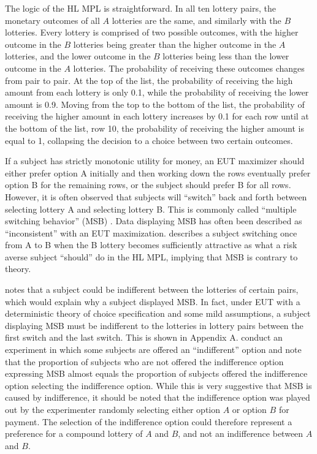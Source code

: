 \documentclass[../main.tex]{subfiles}
\begin{document}
The logic of the HL MPL is straightforward.
In all ten lottery pairs, the monetary outcomes of all $A$ lotteries are the same, and similarly with the $B$ lotteries.
Every lottery is comprised of two possible outcomes, with the higher outcome in the $B$ lotteries being greater than the higher outcome in the $A$ lotteries, and the lower outcome in the $B$ lotteries being less than the lower outcome in the $A$ lotteries.
The probability of receiving these outcomes changes from pair to pair.
At the top of the list, the probability of receiving the high amount from each lottery is only 0.1, while the probability of receiving the lower amount is 0.9.
Moving from the top to the bottom of the list, the probability of receiving the higher amount in each lottery increases by 0.1 for each row until at the bottom of the list, row 10, the probability of receiving the higher amount is equal to 1, collapsing the decision to a choice between two certain outcomes.


If a subject has strictly monotonic utility for money, an EUT maximizer should either prefer option A initially and then working down the rows eventually prefer option B for the remaining rows, or the subject should prefer B for all rows.
However, it is often observed that subjects will \enquote{switch} back and forth between selecting lottery A and selecting lottery B.
This is commonly called \enquote{multiple switching behavior} (MSB) \parencite{Bruner2011}.
Data displaying MSB has often been described as \enquote{inconsistent} with an EUT maximization.
\textcite[1645]{Holt2002} describes a subject switching once from A to B when the B lottery becomes sufficiently attractive as what a risk averse subject \enquote{should} do in the HL MPL, implying that MSB is contrary to theory.


\textcite[347]{Harrison2007} notes that a subject could be indifferent between the lotteries of certain pairs, which would explain why a subject displayed MSB.
In fact, under EUT with a deterministic theory of choice specification and some mild assumptions, a subject displaying MSB must be indifferent to the lotteries in lottery pairs between the first switch and the last switch.
This is shown in Appendix A.
\textcite{Harrison2007} conduct an experiment in which some subjects are offered an \enquote{indifferent} option and note that the proportion of subjects who are not offered the indifference option expressing MSB almost equals the proportion of subjects offered the indifference option  selecting the indifference option.
While this is very suggestive that MSB is caused by indifference, it should be noted that the indifference option was played out by the experimenter randomly selecting either option $A$ or option $B$ for payment.
The selection of the indifference option could therefore represent a preference for a compound lottery of $A$ and $B$, and not an indifference between $A$ and $B$.
\end{document}
